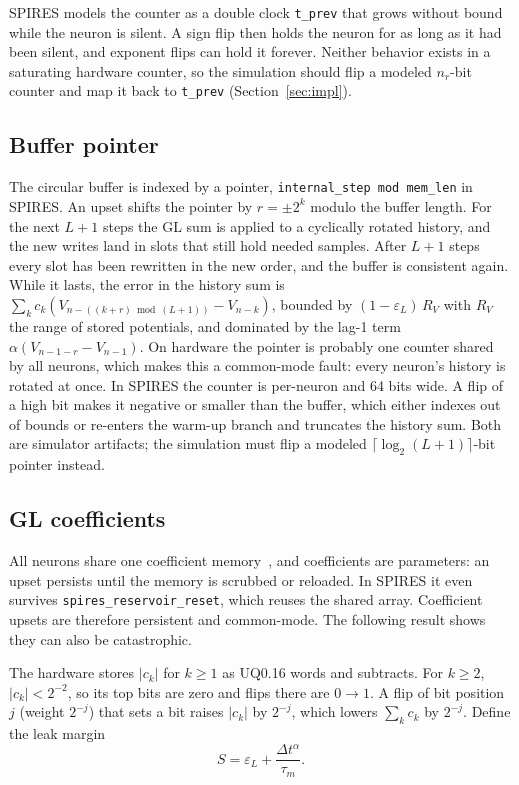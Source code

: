 \documentclass[11pt,a4paper]{article}
\newcommand{\dta}{\Delta t^{\alpha}}
\begin{document}
SPIRES models the counter as a double clock \texttt{t\_prev} that grows without bound while the neuron is silent. A sign flip then holds the neuron for as long as it had been silent, and exponent flips can hold it forever. Neither behavior exists in a saturating hardware counter, so the simulation should flip a modeled $n_r$-bit counter and map it back to \texttt{t\_prev} (Section~\ref{sec:impl}).

\subsection{Buffer pointer}

The circular buffer is indexed by a pointer, \texttt{internal\_step mod mem\_len} in SPIRES. An upset shifts the pointer by $r = \pm 2^{k}$ modulo the buffer length. For the next $L+1$ steps the GL sum is applied to a cyclically rotated history, and the new writes land in slots that still hold needed samples. After $L+1$ steps every slot has been rewritten in the new order, and the buffer is consistent again. While it lasts, the error in the history sum is $\sum_k c_k (V_{n-((k+r) \bmod (L+1))} - V_{n-k})$, bounded by $(1-\varepsilon_L)\,R_V$ with $R_V$ the range of stored potentials, and dominated by the lag-1 term $\alpha(V_{n-1-r} - V_{n-1})$. On hardware the pointer is probably one counter shared by all neurons, which makes this a common-mode fault: every neuron's history is rotated at once. In SPIRES the counter is per-neuron and 64 bits wide. A flip of a high bit makes it negative or smaller than the buffer, which either indexes out of bounds or re-enters the warm-up branch and truncates the history sum. Both are simulator artifacts; the simulation must flip a modeled $\lceil\log_2(L+1)\rceil$-bit pointer instead.

\subsection{GL coefficients}
\label{sec:coeff}

All neurons share one coefficient memory~\cite{dropout2026}, and coefficients are parameters: an upset persists until the memory is scrubbed or reloaded. In SPIRES it even survives \texttt{spires\_reservoir\_reset}, which reuses the shared array. Coefficient upsets are therefore persistent and common-mode. The following result shows they can also be catastrophic.

The hardware stores $|c_k|$ for $k \ge 1$ as UQ0.16 words and subtracts. For $k \ge 2$, $|c_k| < 2^{-2}$, so its top bits are zero and flips there are $0\to1$. A flip of bit position $j$ (weight $2^{-j}$) that sets a bit raises $|c_k|$ by $2^{-j}$, which lowers $\sum_k c_k$ by $2^{-j}$. Define the leak margin
\begin{equation}
S = \varepsilon_L + \frac{\dta}{\tau_m}.
\label{eq:margin}
\end{equation}
\end{document}
